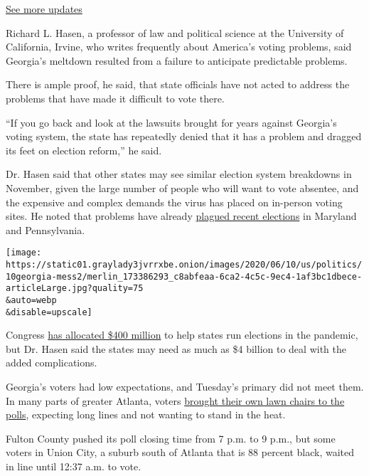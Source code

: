 \href{https://www.nytimes3xbfgragh.onion/live/2020/08/19/us/dnc-convention-election?action=click\&pgtype=Article\&state=default\&region=MAIN_CONTENT_1\&context=storylines_live_updates}{See
more updates}

Richard L. Hasen, a professor of law and political science at the
University of California, Irvine, who writes frequently about America's
voting problems, said Georgia's meltdown resulted from a failure to
anticipate predictable problems.

There is ample proof, he said, that state officials have not acted to
address the problems that have made it difficult to vote there.

``If you go back and look at the lawsuits brought for years against
Georgia's voting system, the state has repeatedly denied that it has a
problem and dragged its feet on election reform,'' he said.

Dr. Hasen said that other states may see similar election system
breakdowns in November, given the large number of people who will want
to vote absentee, and the expensive and complex demands the virus has
placed on in-person voting sites. He noted that problems have already
\href{https://www.npr.org/2020/06/03/869042005/primary-election-snafus-show-challenges-for-november-vote}{plagued
recent elections} in Maryland and Pennsylvania.

\texttt{[image: https://static01.graylady3jvrrxbe.onion/images/2020/06/10/us/politics/10georgia-mess2/merlin\_173386293\_c8abfeaa-6ca2-4c5c-9ec4-1af3bc1dbece-articleLarge.jpg?quality=75\\\&auto=webp\\\&disable=upscale]}

Congress
\href{https://abcnews.go.com/Politics/congress-pours-400-million-boosting-states-election-efforts/story?id=69793454}{has
allocated \$400 million} to help states run elections in the pandemic,
but Dr. Hasen said the states may need as much as \$4 billion to deal
with the added complications.

Georgia's voters had low expectations, and Tuesday's primary did not
meet them. In many parts of greater Atlanta, voters
\href{https://www.atlantamagazine.com/news-culture-articles/lets-talk-to-atlanta-voters-about-their-chairs/}{brought
their own lawn chairs to the polls}, expecting long lines and not
wanting to stand in the heat.

Fulton County pushed its poll closing time from 7 p.m. to 9 p.m., but
some voters in Union City, a suburb south of Atlanta that is 88 percent
black, waited in line until 12:37 a.m. to vote.

